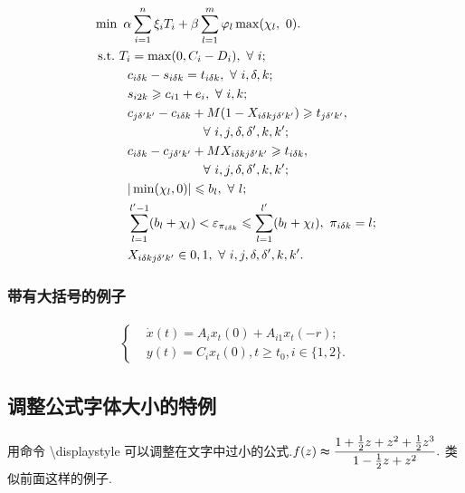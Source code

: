 \documentclass{ctacn}%
\begin{document}
\begin{multicols}{2}
\begin{center}
\begin{align}
&\min~\alpha\sum\limits_{i=1}^n\xi_{i}T_{i}+\beta \sum\limits_{l=1}^m \varphi_{l} \max(\chi_{l},~0).\notag\\
&{\rm{~s.t.~}}T_{i}=\max(0,C_i-D_i),~\forall~i;\notag\\
&~~~~~~~~c_{i \delta k}-s_{i \delta k}=t_{i \delta k},~\forall~i,\delta,k;\notag\\
&~~~~~~~~s_{i 2 k}\geqslant c_{i 1 }+e_i,~\forall~i,k;\notag\\
&~~~~~~~~c_{j \delta' k'}-c_{i \delta k}+M(1-X_{i \delta k j\delta'k'})\geqslant t_{j \delta' k'},\notag\\
&~~~~~~~~~~~~~~~~~~~~~~~~~~\forall~i,j,\delta,\delta',k,k';\notag\\
&~~~~~~~~c_{i \delta k}-c_{j \delta' k'}+M X_{i \delta k j\delta'k'}\geqslant t_{i \delta k},\notag\\
&~~~~~~~~~~~~~~~~~~~~~~~~~~\forall~i,j,\delta,\delta',k,k';\notag\\
&~~~~~~~~|\min(\chi_{l},0)|\leqslant b_l,~\forall~ l;\notag\\
&~~~~~~~~\sum\limits_{l=1}^{l'-1} (b_{l}+\chi_{l})< \varepsilon_{\pi_{i \delta k}}\leqslant  \sum\limits_{l=1}^{l'} (b_{l}+\chi_{l}),~\pi_{i \delta k}=l;\notag\\
&~~~~~~~~X_{i \delta k j\delta'k'} \in {0,1},~\forall~ i,j,\delta,\delta',k,k'.
\end{align}
\end{center}


\subsubsection{带有大括号的例子}\vspace{-15pt}
\begin{align}
\left\{\begin{aligned}
&\dot{x}(t)=A_{i}x_{t}(0)+A_{i1}x_{t}(-r);\\
&y(t)=C_{i}x_{t}(0),t\geqslant t_{0}, i\in\{1, 2\}.
\end{aligned}\right.
\end{align}


\subsection{调整公式字体大小的特例}

用命令 \textbackslash displaystyle  可以调整在文字中过小的公式.\;$f(z)\thickapprox{\displaystyle\frac{1+\frac{1}{2}z+z^2+\frac{1}{2}z^3}{1-\frac{1}{2}z+z^2}}.$
类似前面这样的例子.


\end{multicols}
\end{document}
